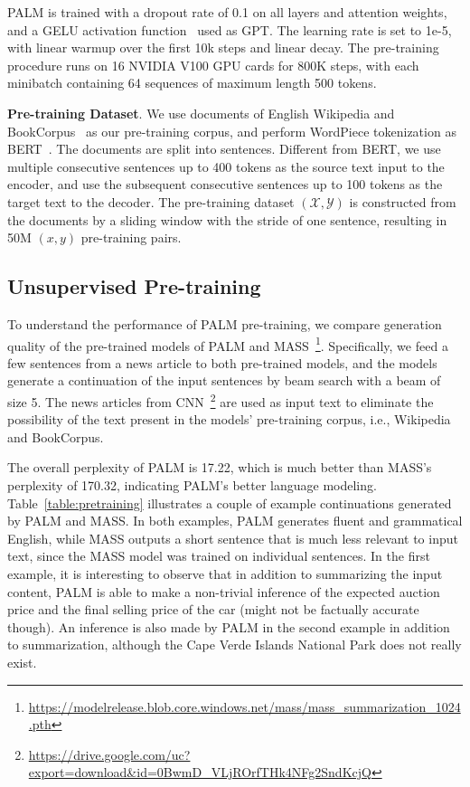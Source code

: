 \documentclass[11pt,a4paper]{article}
\newcommand{\method}{PALM\xspace}
\begin{document}
\method is trained with a dropout rate of 0.1 on all layers and attention weights, and a GELU activation function~\cite{Hendrycks:2016} used as GPT. The learning rate is set to 1e-5, with linear warmup over the first 10k steps and linear decay. The pre-training procedure runs on 16 NVIDIA V100 GPU cards for 800K steps, with each minibatch containing 64 sequences of maximum length 500 tokens.

\textbf{Pre-training Dataset}. We use documents of English Wikipedia and BookCorpus~\cite{DBLP:journals/corr/ZhuKZSUTF15} as our pre-training corpus, and perform WordPiece tokenization as BERT~\cite{bert2018jacob}. The documents are split into sentences. Different from BERT, we use multiple consecutive sentences up to 400 tokens as the source text input to the encoder, and use the subsequent consecutive sentences up to 100 tokens as the target text to the decoder. The pre-training dataset $(\mathcal{X},\mathcal{Y})$ is constructed from the documents by a sliding window with the stride of one sentence, resulting in 50M $(x,y)$ pre-training pairs.

\subsection{Unsupervised Pre-training}
To understand the performance of \method pre-training, we compare generation quality of the pre-trained models of \method and MASS~\footnote{\url{https://modelrelease.blob.core.windows.net/mass/mass_summarization_1024.pth}}. Specifically, we feed a few sentences from a news article to both pre-trained models, and the models generate a continuation of the input sentences by beam search with a beam of size 5. The news articles from CNN~\footnote{\url{https://drive.google.com/uc?export=download&id=0BwmD_VLjROrfTHk4NFg2SndKcjQ}} are used as input text to eliminate the possibility of the text present in the models' pre-training corpus, i.e., Wikipedia and BookCorpus.

The overall perplexity of \method is 17.22, which is much better than MASS's perplexity of 170.32, indicating \method's better language modeling. Table~\ref{table:pretraining} illustrates a couple of example continuations generated by \method and MASS. In both examples, \method generates fluent and grammatical English, while MASS outputs a short sentence that is much less relevant to input text, since the MASS model was trained on individual sentences. In the first example, it is interesting to observe that in addition to summarizing the input content, \method is able to make a non-trivial inference of the expected auction price and the final selling price of the car (might not be factually accurate though). An inference is also made by \method in the second example in addition to summarization, although the Cape Verde Islands National Park does not really exist.
\end{document}
